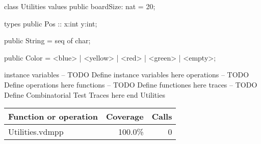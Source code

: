 \begin{vdm_al}
class Utilities
  values
    public boardSize: nat = 20;

  types
        public Pos :: x:int y:int;
        
    public String = seq of char;
    
    public Color = <blue> | <yellow> | <red> | <green> | <empty>;
    
  instance variables
-- TODO Define instance variables here
  operations
-- TODO Define operations here
  functions
-- TODO Define functiones here
  traces
-- TODO Define Combinatorial Test Traces here
end Utilities
\end{vdm_al}
\bigskip
\begin{longtable}{|l|r|r|}
\hline
Function or operation & Coverage & Calls \\
\hline
\hline
\hline
Utilities.vdmpp & 100.0\% & 0 \\
\hline
\end{longtable}

